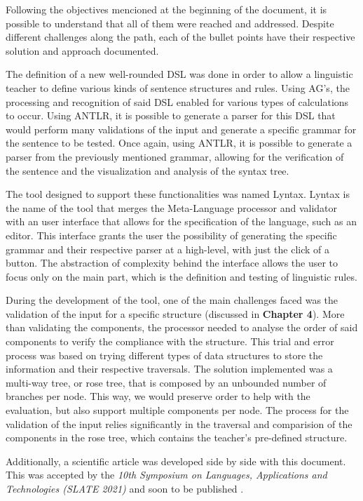 Following the objectives mencioned at the beginning of the document, it is possible to understand that all of them were reached and addressed.
Despite different challenges along the path, each of the bullet points have their respective solution and approach documented.

The definition of a new well-rounded DSL was done in order to allow a linguistic teacher to define various kinds of sentence structures and rules.
Using AG's, the processing and recognition of said DSL enabled for various types of calculations to occur.
Using ANTLR, it is possible to generate a parser for this DSL that would perform many validations of the input and generate a specific grammar for the sentence to be tested.
Once again, using ANTLR, it is possible to generate a parser from the previously mentioned grammar, allowing for the verification of the sentence and the visualization and analysis
of the syntax tree.

The tool designed to support these functionalities was named Lyntax. Lyntax is the name of the tool that merges the Meta-Language processor and validator with an
user interface that allows for the specification of the language, such as an editor.
This interface grants the user the possibility of generating the specific grammar and their respective parser at a high-level, with just the click of a button.
The abstraction of complexity behind the interface allows the user to focus only on the main part, which is the definition and testing of linguistic rules.

During the development of the tool, one of the main challenges faced was the validation of the input for a specific structure (discussed in \textbf{Chapter 4}).
More than validating the components, the processor needed to analyse the order of said components to verify the compliance with the structure.
This trial and error process was based on trying different types of data structures to store the information and their respective traversals.
The solution implemented was a multi-way tree, or rose tree, that is composed by an unbounded number of branches per node.
This way, we would preserve order to help with the evaluation, but also support multiple components per node.
The process for the validation of the input relies significantly in the traversal and comparision of the components in the rose tree, 
which contains the teacher's pre-defined structure. 

Additionally, a scientific article was developed side by side with this document. 
This was accepted by the \textit{10th Symposium on Languages, Applications and Technologies (SLATE 2021)} and soon to be published \cite{SPH:2021b}.

